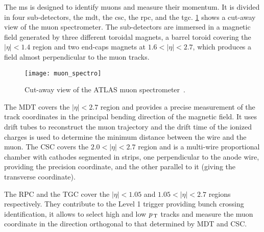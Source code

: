 The \gls{ms} is designed to identify muons and measure their momentum. It is
divided in four sub-detectors, the \gls{mdt}, the \gls{csc}, the \gls{rpc}, and
the \gls{tgc}. \cref{fig:muon_spectro} shows a cut-away view of the muon
spectrometer. The sub-detectors are immersed in a magnetic field generated by
three different toroidal magnets, a barrel toroid covering the $|\eta| < 1.4$
region and two end-caps magnets at $1.6 < |\eta| < 2.7$, which produces a field
almost perpendicular to the muon tracks.
\begin{figure}[!htb]
  \centering
    \texttt{[image: muon\_spectro]}
    \caption{Cut-away view of the ATLAS muon spectrometer~\cite{ATLASPaper}.}
    \label{fig:muon_spectro}
\end{figure}

The MDT covers the $|\eta| < 2.7$ region and provides a precise measurement of
the track coordinates in the principal bending direction of the magnetic
field. It uses drift tubes to reconstruct the muon trajectory and the drift time
of the ionized charges is used to determine the minimum distance between the
wire and the muon. The CSC covers the $2.0 < |\eta| < 2.7$ region and is a
multi-wire proportional chamber with cathodes segmented in strips, one
perpendicular to the anode wire, providing the precision coordinate, and the
other parallel to it (giving the transverse coordinate).


The RPC and the TGC cover the $|\eta| < 1.05$ and $1.05 < |\eta| < 2.7$ regions
respectively. They contribute to the Level 1 trigger providing bunch crossing
identification, it allows to select high and low $p_\mathrm{\, T}$ tracks and measure the
muon coordinate in the direction orthogonal to that determined by MDT and CSC\@.
